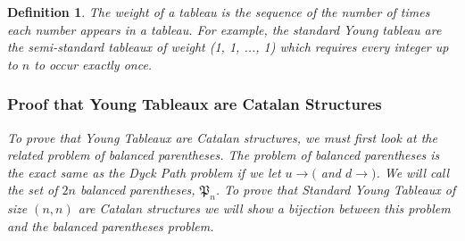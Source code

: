 \documentclass[12pt]{article}
\newtheorem{definition}{Definition}
\newcommand{\BalParen}{\mathfrak{P}}
\begin{document}
\begin{definition}
The weight of a tableau is the sequence of the number of times each number appears in a tableau. For example, the standard Young tableau are the semi-standard tableaux of weight (1, 1, ..., 1) which requires every integer up to $n$ to occur exactly once.

\subsubsection{Proof that Young Tableaux are Catalan Structures}
To prove that Young Tableaux are Catalan structures, we must first look at the related problem of balanced parentheses. The problem of balanced parentheses is the exact same as the Dyck Path problem if we let $u \rightarrow ($ and $d \rightarrow )$. We will call the set of $2n$ balanced parentheses, $\BalParen_n$. To prove that Standard Young Tableaux of size $(n,n)$ are Catalan structures we will show a bijection between this problem and the balanced parentheses problem. \cite{YoungTableauxShirek}

\end{definition}
\end{document}
